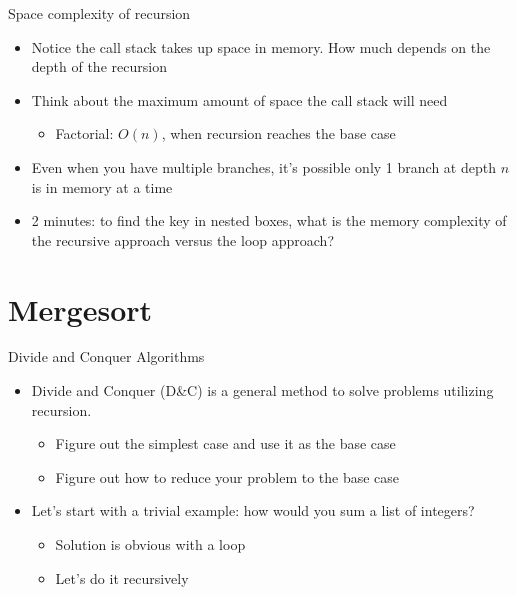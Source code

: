\documentclass[
  ignorenonframetext,
]{beamer}
\providecommand{\tightlist}{%
  \setlength{\itemsep}{0pt}\setlength{\parskip}{0pt}}\usepackage{longtable,booktabs,array}
\begin{document}
\begin{frame}{Space complexity of recursion}
\protect\hypertarget{space-complexity-of-recursion}{}
\begin{itemize}
\item
  Notice the call stack takes up space in memory. How much depends on
  the depth of the recursion
\item
  Think about the maximum amount of space the call stack will need

  \begin{itemize}
  \tightlist
  \item
    Factorial: \(O(n)\), when recursion reaches the base case
  \end{itemize}
\item
  Even when you have multiple branches, it's possible only 1 branch at
  depth \(n\) is in memory at a time
\item
  2 minutes: to find the key in nested boxes, what is the memory
  complexity of the recursive approach versus the loop approach?
\end{itemize}
\end{frame}

\hypertarget{mergesort}{%
\section{Mergesort}\label{mergesort}}

\begin{frame}{Divide and Conquer Algorithms}
\protect\hypertarget{divide-and-conquer-algorithms}{}
\begin{itemize}
\item
  Divide and Conquer (D\&C) is a general method to solve problems
  utilizing recursion.

  \begin{itemize}
  \item
    Figure out the simplest case and use it as the base case
  \item
    Figure out how to reduce your problem to the base case
  \end{itemize}
\item
  Let's start with a trivial example: how would you sum a list of
  integers?

  \begin{itemize}
  \item
    Solution is obvious with a loop
  \item
    Let's do it recursively
  \end{itemize}
\end{itemize}
\end{frame}
\end{document}
